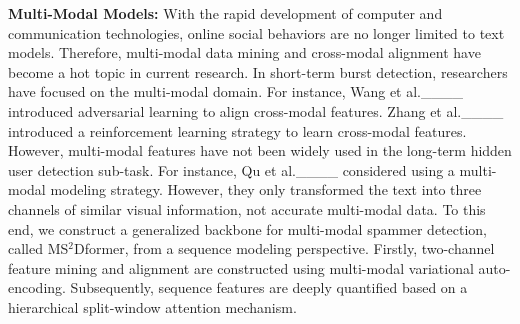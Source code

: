 \par \textbf{Multi-Modal Models:} With the rapid development of computer and communication technologies, online social behaviors are no longer limited to text models. Therefore, multi-modal data mining and cross-modal alignment have become a hot topic in current research. In short-term burst detection, researchers have focused on the multi-modal domain. For instance, Wang et al.____ introduced adversarial learning to align cross-modal features. Zhang et al.____ introduced a reinforcement learning strategy to learn cross-modal features. However, multi-modal features have not been widely used in the long-term hidden user detection sub-task. For instance, Qu et al.____ considered using a multi-modal modeling strategy. However, they only transformed the text into three channels of similar visual information, not accurate multi-modal data. To this end, we construct a generalized backbone for multi-modal spammer detection, called MS$^2$Dformer, from a sequence modeling perspective. Firstly, two-channel feature mining and alignment are constructed using multi-modal variational auto-encoding. Subsequently, sequence features are deeply quantified based on a hierarchical split-window attention mechanism.